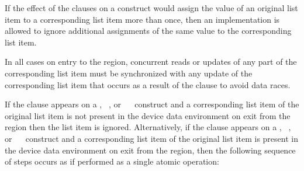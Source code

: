 \begin{note}
If the effect of the  clauses on a construct would assign the
value of an original list item to a corresponding list item more than once,
then an implementation is allowed to ignore additional assignments of
the same value to the corresponding list item.
\end{note}

In all cases on entry to the region, concurrent reads or updates of any part 
of the corresponding list item must be synchronized with any update of the 
corresponding list item that occurs as a result of the  clause to
avoid data races.

If the  clause appears on a , ~, 
or ~~ construct and a corresponding list item 
of the original list item is not present in the device data environment on exit 
from the region then the list item is ignored. Alternatively, if the  
clause appears on a , ~, or 
~~ construct and a corresponding list item of 
the original list item is present in the device data environment on exit from the 
region, then the following sequence of steps occurs as if performed as a single 
atomic operation:


